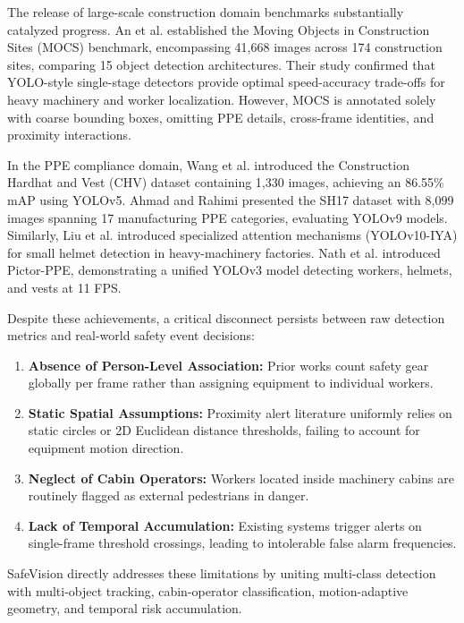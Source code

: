 \documentclass[letterpaper, 10 pt, conference]{ieeeconf}
\begin{document}
The release of large-scale construction domain benchmarks substantially catalyzed progress. An et al. \cite{an2021dataset} established the Moving Objects in Construction Sites (MOCS) benchmark, encompassing 41,668 images across 174 construction sites, comparing 15 object detection architectures. Their study confirmed that YOLO-style single-stage detectors \cite{redmon2016you} provide optimal speed-accuracy trade-offs for heavy machinery and worker localization. However, MOCS is annotated solely with coarse bounding boxes, omitting PPE details, cross-frame identities, and proximity interactions.

In the PPE compliance domain, Wang et al. \cite{wang2021fast} introduced the Construction Hardhat and Vest (CHV) dataset containing 1,330 images, achieving an 86.55\% mAP using YOLOv5. Ahmad and Rahimi \cite{ahmad2024sh17} presented the SH17 dataset with 8,099 images spanning 17 manufacturing PPE categories, evaluating YOLOv9 models. Similarly, Liu et al. \cite{liu2025safety} introduced specialized attention mechanisms (YOLOv10-IYA) for small helmet detection in heavy-machinery factories. Nath et al. \cite{nath2020deep} introduced Pictor-PPE, demonstrating a unified YOLOv3 model detecting workers, helmets, and vests at 11 FPS.

Despite these achievements, a critical disconnect persists between raw detection metrics and real-world safety event decisions:
\begin{enumerate}
    \item \textbf{Absence of Person-Level Association:} Prior works count safety gear globally per frame rather than assigning equipment to individual workers.
    \item \textbf{Static Spatial Assumptions:} Proximity alert literature uniformly relies on static circles or 2D Euclidean distance thresholds, failing to account for equipment motion direction.
    \item \textbf{Neglect of Cabin Operators:} Workers located inside machinery cabins are routinely flagged as external pedestrians in danger.
    \item \textbf{Lack of Temporal Accumulation:} Existing systems trigger alerts on single-frame threshold crossings, leading to intolerable false alarm frequencies.
\end{enumerate}

SafeVision directly addresses these limitations by uniting multi-class detection with multi-object tracking, cabin-operator classification, motion-adaptive geometry, and temporal risk accumulation.
\end{document}
